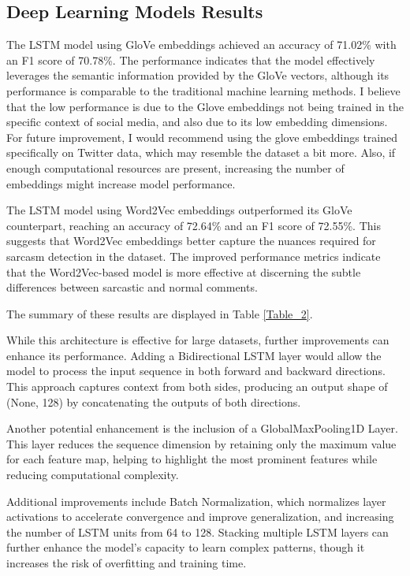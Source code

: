 \subsection{Deep Learning Models Results}

The LSTM model using GloVe embeddings achieved an accuracy of 71.02\% with an F1 score of 70.78\%. The performance indicates that the model effectively leverages the semantic information provided 
by the GloVe vectors, although its performance is comparable to the traditional machine learning methods. I believe that the low performance is due to the Glove embeddings not being trained in 
the specific context of social media, and also due to its low embedding dimensions. For future improvement, I would recommend using the glove embeddings trained specifically on Twitter data, which 
may resemble the dataset a bit more. Also, if enough computational resources are present, increasing the number of embeddings might increase model performance.

The LSTM model using Word2Vec embeddings outperformed its GloVe counterpart, reaching an accuracy of 72.64\% and an F1 score of 72.55\%. This suggests that Word2Vec embeddings better capture the 
nuances required for sarcasm detection in the dataset. The improved performance metrics indicate that the Word2Vec-based model is more effective at discerning the subtle differences between sarcastic 
and normal comments.

The summary of these results are displayed in Table \ref{Table_2}.

While this architecture is effective for large datasets, further improvements can enhance its performance. Adding a Bidirectional LSTM layer would allow the model to process the input sequence in both 
forward and backward directions. This approach captures context from both sides, producing an output shape of (None, 128) by concatenating the outputs of both directions.

Another potential enhancement is the inclusion of a GlobalMaxPooling1D Layer. This layer reduces the sequence dimension by retaining only the maximum value for each feature map, helping to highlight 
the most prominent features while reducing computational complexity.

Additional improvements include Batch Normalization, which normalizes layer activations to accelerate convergence and improve generalization, and increasing the number of LSTM units from 64 to 128. 
Stacking multiple LSTM layers can further enhance the model's capacity to learn complex patterns, though it increases the risk of overfitting and training time.

